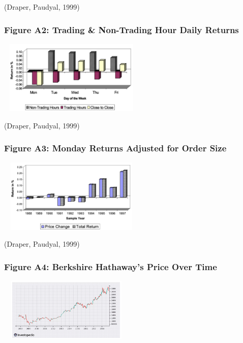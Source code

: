 \documentclass[11pt, english]{article}
\begin{document}
			(Draper, Paudyal, 1999)

		\subsubsection*{Figure A2: Trading \& Non-Trading Hour Daily Returns}

			\begin{center}
                                \includegraphics[width=7cm,height=3.5cm]{A2.png}
                        \end{center}

			(Draper, Paudyal, 1999)

		\subsubsection*{Figure A3: Monday Returns Adjusted for Order Size}
                        
                        \begin{center}
                                \includegraphics[width=7cm,height=3.5cm]{A3.png}
                        \end{center}

                        (Draper, Paudyal, 1999)

		\subsubsection*{Figure A4: Berkshire Hathaway’s Price Over Time}   
                        
                        \begin{center}
                                \includegraphics[width=6.5cm,height=3cm]{A4.png}
                        \end{center}
\end{document}
